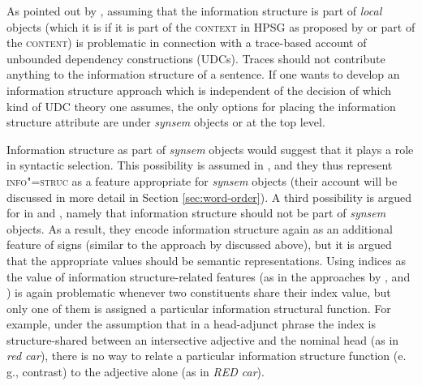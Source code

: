 \documentclass[output=paper
                ,modfonts
                ,nonflat
	        ,collection
	        ,collectionchapter
	        ,collectiontoclongg
 	        ,biblatex
                ,babelshorthands
                ,newtxmath
                ,draftmode
                ,colorlinks, citecolor=brown
]{./langsci/langscibook}
\begin{document}
As pointed out by \cite{deKuthy2002a}, assuming that the information
structure is part of \textit{local} objects (which it is if it is part
of the \textsc{context} in HPSG as proposed by \citealt{EV96a} or part of
the \textsc{content}) is problematic in connection with a trace-based
account of unbounded dependency constructions (UDCs). Traces should not contribute
anything to the information structure of a sentence. If one wants to
develop an information structure approach which is independent of the
decision of which kind of UDC theory one assumes, the only options for
placing the information structure attribute are under \textit{synsem}
objects or at the top level.

Information structure as part of \textit{synsem} objects would suggest
that it plays a role in syntactic selection. This possibility is
assumed in \cite{BC2011b}, and they thus represent
\textsc{info"=struc} as a feature appropriate for \textit{synsem}
objects (their account will be discussed in more detail in Section
\ref{sec:word-order}).  A third possibility is argued for in
\cite{deKuthy2002a} and \cite{Bildhauer2008a}, namely that information
structure should not be part of \textit{synsem} objects. As a result,
they encode information structure again as an additional feature of
signs (similar to the approach by \citealt{Mandahar94a-u} discussed above), but
it is argued that the appropriate values should be semantic
representations. Using indices as the value of information
structure-related features (as in the approaches by
\citealt{Paggio2009a-u}, \citealt{song-bender:2012} and \citealt{song2018}) is again
problematic whenever two constituents share their index value, but
only one of them is assigned a particular information structural
function. For example, under the assumption that in a head-adjunct
phrase the index is structure-shared between an intersective adjective
and the nominal head (as in \textit{red car}), there is no way to
relate a particular information structure function (e. g., contrast) to the adjective
alone (as in \textit{RED car}).
\end{document}
